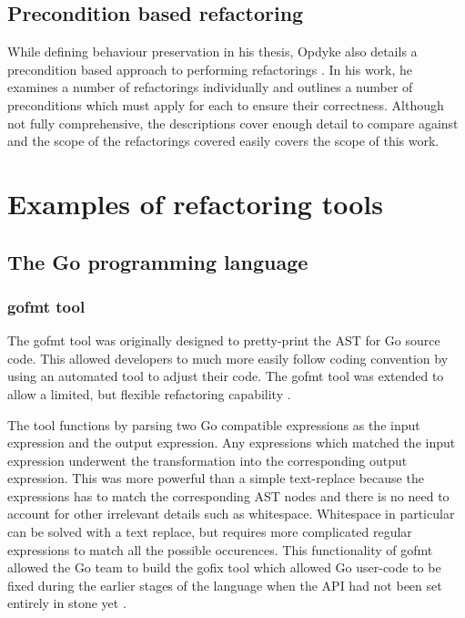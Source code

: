 


\subsection{Precondition based refactoring}
While defining behaviour preservation  in his thesis, Opdyke also details a precondition based approach to performing refactorings \cite{opdyke1992refactoring}. In his work, he examines a number of refactorings individually and outlines a number of preconditions which must apply for each to ensure their correctness. Although not fully comprehensive, the descriptions cover enough detail to compare against and the scope of the refactorings covered easily covers the scope of this work.

\section{Examples of refactoring tools}\label{S:exback}
\subsection{The Go programming language}
\subsubsection{gofmt tool}
The gofmt tool was originally designed to pretty-print the AST for Go source code. This allowed developers to much more easily follow coding convention by using an automated tool to adjust their code. The gofmt tool was extended to allow a limited, but flexible refactoring capability \cite{gofmt15}. 

The tool functions by parsing two Go compatible expressions as the input expression and the output expression. Any expressions which matched the input expression underwent the transformation into the corresponding output expression. This was more powerful than a simple text-replace because the expressions has to match the corresponding AST nodes and there is no need to account for other irrelevant details such as whitespace. Whitespace in particular can be solved with a text replace, but requires more complicated regular expressions to match all the possible occurences. This functionality of gofmt allowed the Go team to build the gofix tool which allowed Go user-code to be fixed during the earlier stages of the language when the API had not been set entirely in stone yet \cite{gofix11}.

